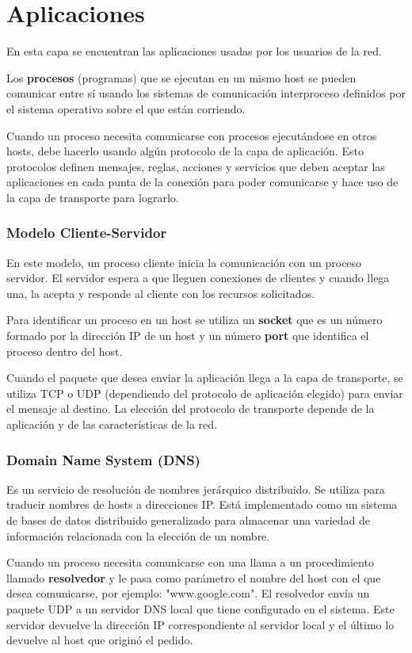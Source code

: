 \part{Aplicaciones}
En esta capa se encuentran las aplicaciones usadas por los usuarios de la red. 

Los \textbf{procesos} (programas) que se ejecutan en un mismo host se pueden comunicar entre sí usando los sistemas de comunicación interproceso definidos por el sistema operativo sobre el que están corriendo.

Cuando un proceso necesita comunicarse con procesos ejecutándose en otros hosts, debe hacerlo usando algún protocolo de la capa de aplicación. Esto protocolos definen mensajes, reglas, acciones y servicios que deben aceptar las aplicaciones en cada punta de la conexión para poder comunicarse y hace uso de la capa de transporte para lograrlo.

\section{Modelo Cliente-Servidor}
En este modelo, un proceso cliente inicia la comunicación con un proceso servidor. El servidor espera a que lleguen conexiones de clientes y cuando llega una, la acepta y responde al cliente con los recursos solicitados.

Para identificar un proceso en un host se utiliza un \textbf{socket} que es un número formado por la dirección IP de un host y un número \textbf{port} que identifica el proceso dentro del host. 

Cuando el paquete que desea enviar la aplicación llega a la capa de transporte, se utiliza TCP o UDP (dependiendo del protocolo de aplicación elegido) para enviar el mensaje al destino. La elección del protocolo de transporte depende de la aplicación y de las características de la red. 

\section{Domain Name System (DNS)}
Es un servicio de resolución de nombres jerárquico distribuido. Se utiliza para traducir nombres de hosts a direcciones IP. Está implementado como un sistema de bases de datos distribuido generalizado para almacenar una variedad de información relacionada con la elección de un nombre.

Cuando un proceso necesita comunicarse con una llama a un procedimiento llamado \textbf{resolvedor} y le pasa como parámetro el nombre del host con el que desea comunicarse, por ejemplo: "www.google.com". El resolvedor envía un paquete UDP a un servidor DNS local que tiene configurado en el sistema. Este servidor devuelve la dirección IP correspondiente al servidor local y el último lo devuelve al host que originó el pedido.

